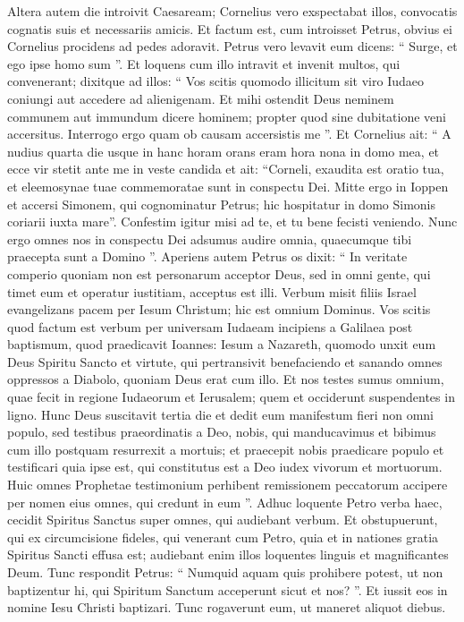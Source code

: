 \begin{biblechapter}
\begin{biblechapter}
\begin{biblechapter}
\begin{biblechapter}
\begin{biblechapter}
\begin{biblechapter}
\begin{biblechapter}
\begin{biblechapter}
\begin{biblechapter}
\begin{biblechapter}
\verse Altera autem die introivit Caesaream; Cornelius vero exspectabat illos, convocatis cognatis suis et necessariis amicis. 
\verse Et factum est, cum introisset Petrus, obvius ei Cornelius procidens ad pedes adoravit. 
\verse Petrus vero levavit eum dicens: “ Surge, et ego ipse homo sum ”. 
\verse Et loquens cum illo intravit et invenit multos, qui convenerant; 
 \verse dixitque ad illos: “ Vos scitis quomodo illicitum sit viro Iudaeo coniungi aut accedere ad alienigenam. Et mihi ostendit Deus neminem communem aut immundum dicere hominem; 
\verse propter quod sine dubitatione veni accersitus. Interrogo ergo quam ob causam accersistis me ”. 
\verse Et Cornelius ait: “ A nudius quarta die usque in hanc horam orans eram hora nona in domo mea, et ecce vir stetit ante me in veste candida 
\verse et ait: “Corneli, exaudita est oratio tua, et eleemosynae tuae commemoratae sunt in conspectu Dei. 
\verse Mitte ergo in Ioppen et accersi Simonem, qui cognominatur Petrus; hic hospitatur in domo Simonis coriarii iuxta mare”. 
\verse Confestim igitur misi ad te, et tu bene fecisti veniendo. Nunc ergo omnes nos in conspectu Dei adsumus audire omnia, quaecumque tibi praecepta sunt a Domino ”.
 \verse Aperiens autem Petrus os dixit: “ In veritate comperio quoniam non est personarum acceptor Deus, 
\verse sed in omni gente, qui timet eum et operatur iustitiam, acceptus est illi. 
\verse Verbum misit filiis Israel evangelizans pacem per Iesum Christum; hic est omnium Dominus. 
\verse Vos scitis quod factum est verbum per universam Iudaeam incipiens a Galilaea post baptismum, quod praedicavit Ioannes: 
\verse Iesum a Nazareth, quomodo unxit eum Deus Spiritu Sancto et virtute, qui pertransivit benefaciendo et sanando omnes oppressos a Diabolo, quoniam Deus erat cum illo. 
\verse Et nos testes sumus omnium, quae fecit in regione Iudaeorum et Ierusalem; quem et occiderunt suspendentes in ligno. 
\verse Hunc Deus suscitavit tertia die et dedit eum manifestum fieri 
 \verse non omni populo, sed testibus praeordinatis a Deo, nobis, qui manducavimus et bibimus cum illo postquam resurrexit a mortuis; 
\verse et praecepit nobis praedicare populo et testificari quia ipse est, qui constitutus est a Deo iudex vivorum et mortuorum. 
\verse Huic omnes Prophetae testimonium perhibent remissionem peccatorum accipere per nomen eius omnes, qui credunt in eum ”.
 \verse Adhuc loquente Petro verba haec, cecidit Spiritus Sanctus super omnes, qui audiebant verbum. 
\verse Et obstupuerunt, qui ex circumcisione fideles, qui venerant cum Petro, quia et in nationes gratia Spiritus Sancti effusa est; 
 \verse audiebant enim illos loquentes linguis et magnificantes Deum. Tunc respondit Petrus: 
\verse “ Numquid aquam quis prohibere potest, ut non baptizentur hi, qui Spiritum Sanctum acceperunt sicut et nos? ”. 
\verse Et iussit eos in nomine Iesu Christi baptizari. Tunc rogaverunt eum, ut maneret aliquot diebus.
 

\end{biblechapter}
\end{biblechapter}
\end{biblechapter}
\end{biblechapter}
\end{biblechapter}
\end{biblechapter}
\end{biblechapter}
\end{biblechapter}
\end{biblechapter}
\end{biblechapter}
